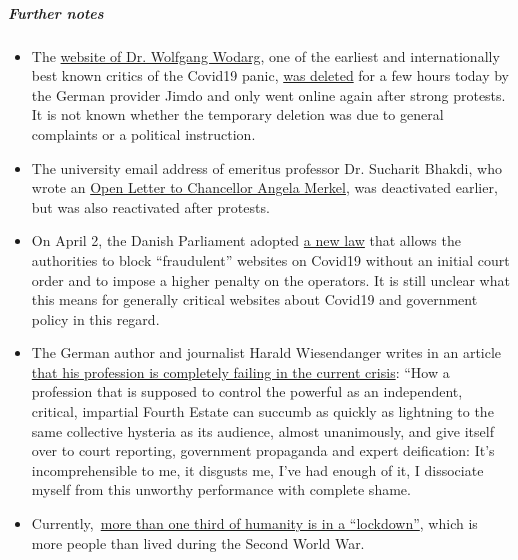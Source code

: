 \hypertarget{further-notes}{%
\subparagraph{\texorpdfstring{\textbf{Further
notes}}{Further notes}}\label{further-notes}}

\begin{itemize}
\tightlist
\item
  The \href{http://wodarg.com/}{website of Dr. Wolfgang Wodarg}, one of
  the earliest and internationally best known critics of the Covid19
  panic, \href{https://twitter.com/wodarg}{was deleted} for a few hours
  today by the German provider Jimdo and only went online again after
  strong protests. It is not known whether the temporary deletion was
  due to general complaints or a political instruction.
\item
  The university email address of emeritus professor Dr. Sucharit
  Bhakdi, who wrote an
  \href{https://swprs.org/open-letter-from-professor-sucharit-bhakdi-to-german-chancellor-dr-angela-merkel/}{Open
  Letter to Chancellor Angela Merkel}, was deactivated earlier, but was
  also reactivated after protests.
\item
  On April 2, the Danish Parliament adopted
  \href{https://www.ft.dk/ripdf/samling/20191/lovforslag/l157/20191_l157_som_vedtaget.pdf}{a
  new law} that allows the authorities to block ``fraudulent'' websites
  on Covid19 without an initial court order and to impose a higher
  penalty on the operators. It is still unclear what this means for
  generally critical websites about Covid19 and government policy in
  this regard.
\item
  The German author and journalist Harald Wiesendanger writes in an
  article
  \href{https://www.nachrichten-fabrik.de/news/harald-wiesendanger-ueber-die-massenmedien-waehrend-der-corona-krise-ich-schaeme-mich---meines-berufsstands-152103}{that
  his profession is completely failing in the current crisis}: ``How a
  profession that is supposed to control the powerful as an independent,
  critical, impartial Fourth Estate can succumb as quickly as lightning
  to the same collective hysteria as its audience, almost unanimously,
  and give itself over to court reporting, government propaganda and
  expert deification: It's incomprehensible to me, it disgusts me, I've
  had enough of it, I dissociate myself from this unworthy performance
  with complete shame.
\item
  Currently,~\href{https://www.sciencealert.com/one-third-of-the-world-s-population-are-now-restricted-in-where-they-can-go}{more
  than one third of humanity is in a ``lockdown''}, which is more people
  than lived during the Second World War.

\end{itemize}
